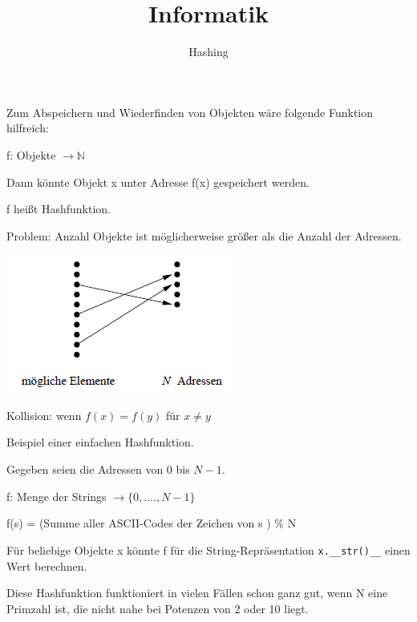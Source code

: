 \documentclass{beamer}
\begin{document}
\title{Informatik}   
\author{Hashing} 
\date{}
\frame{\titlepage} 

\begin{frame}[fragile]


Zum Abspeichern und Wiederfinden von Objekten wäre folgende Funktion hilfreich: 

 f: Objekte $ \rightarrow \mathbb{N}$ 

Dann könnte Objekt x unter Adresse f(x) gespeichert werden. 

f heißt Hashfunktion. \pause

Problem: Anzahl Objekte ist möglicherweise größer als die Anzahl der Adressen.  

\includegraphics[scale=0.6]{bild1.png}  

Kollision: wenn $f(x) = f(y)$ für $x \ne y$ 
\end{frame}

\begin{frame}[fragile]

Beispiel einer einfachen Hashfunktion. 

Gegeben seien die Adressen von 0 bis $N-1$.  

f: Menge der Strings $\rightarrow \{0,....,N-1\}$ \pause

f(s) = (Summe aller ASCII-Codes der Zeichen von s ) \% N \pause

Für beliebige Objekte x könnte f für die String-Repräsentation \texttt{x.\_\_str()\_\_} einen Wert berechnen.

Diese Hashfunktion funktioniert in vielen Fällen schon ganz gut, wenn N eine Primzahl ist, die nicht nahe bei Potenzen von 2 oder 10 liegt.

\end{frame}
\end{document}

